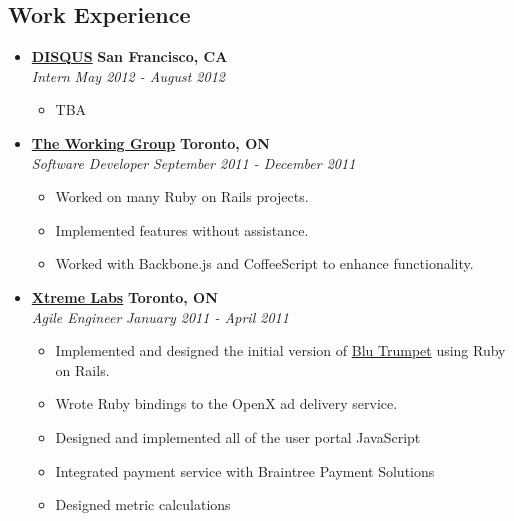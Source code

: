 \documentclass[10pt,letterpaper]{article}
\begin{document}
\subsection*{Work Experience}
  \begin{itemize}
    \parskip=-0.1em

    \item[]
    {\href{http://www.disqus.com}{\textbf{DISQUS}} \hfill
      \textbf{San Francisco, CA}}
    \\
    {\emph{Intern} \hfill \emph{May 2012 - August 2012}}

    \begin{itemize}[label=\textbullet]
      \itemsep0em
      \item TBA
    \end{itemize}


    \item[]
    {\href{http://www.twg.ca}{\textbf{The Working Group}} \hfill
      \textbf{Toronto, ON}}
    \\
    {\emph{Software Developer} \hfill \emph{September 2011 - December 2011}}

    \begin{itemize}[label=\textbullet]
      \itemsep0em
      \item Worked on many Ruby on Rails projects.
      \item Implemented features without assistance.
      \item Worked with Backbone.js and CoffeeScript to enhance functionality.
    \end{itemize}

    \item[]

    {\href{http://www.xtremelabs.com/}{\textbf{Xtreme Labs}} \hfill
      \textbf{Toronto, ON}}
    \\
    {\emph{Agile Engineer} \hfill \emph{January 2011 - April 2011}}

    \begin{itemize}[label=\textbullet]
      \itemsep0em
      \item Implemented and designed the initial version of
            \href{http://www.blutrumpet.com/}{Blu Trumpet} using Ruby on Rails.
      \item Wrote Ruby bindings to the OpenX ad delivery service.
      \item Designed and implemented all of the user portal JavaScript
      \item Integrated payment service with Braintree Payment Solutions
      \item Designed metric calculations
    \end{itemize}


\end{itemize}
\end{document}
